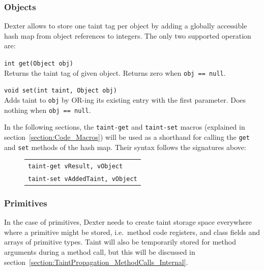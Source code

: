\documentclass[12pt,twoside,notitlepage]{report}
\newcommand{\centerbox}[1] {
	\begin{center}
	\begin{footnotesize}
	\begin{tabular}{l}
		#1
	\end{tabular}
	\end{footnotesize}
	\end{center}
}
\newcommand{\asm}[1] {\texttt{#1}}
\begin{document}
\subsubsection{Objects}
\label{section:TaintTagStorage_Objects}

Dexter allows to store one taint tag per object by adding a globally accessible hash map from object references to integers. The only two supported operation are:
\begin{description} 
\item \verb$int get(Object obj)$ \\
Returns the taint tag of given object. Returns zero when \verb$obj == null$.
\item \verb$void set(int taint, Object obj)$ \\
Adds taint to \verb$obj$ by OR-ing its existing entry with the first parameter. Does nothing when \verb$obj == null$.
\end{description}

In the following sections, the \verb$taint-get$ and \verb$taint-set$ macros (explained in section~\ref{section:Code_Macros}) will be used as a shorthand for calling the \verb$get$ and \verb$set$ methods of the hash map. Their syntax follows the signatures above:

	\begin{figure}[H]
		\centerbox{
			\asm{taint-get vResult, vObject} \\
			\asm{taint-set vAddedTaint, vObject}
		}
	\end{figure}

\subsubsection{Primitives}

\label{section:TaintStorage_Primitives}

In the case of primitives, Dexter needs to create taint storage space everywhere where a primitive might be stored, i.e.\ method code registers, and class fields and arrays of primitive types. Taint will also be temporarily stored for method arguments during a method call, but this will be discussed in section~\ref{section:TaintPropagation_MethodCalls_Internal}.
\end{document}
